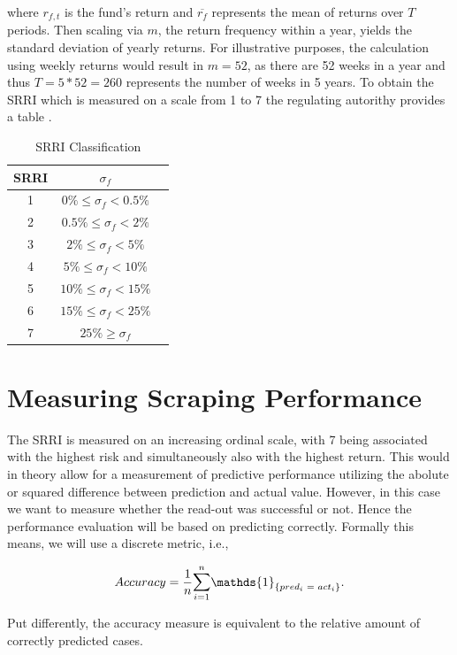 \documentclass[aodsor,preprint]{imsart}
\numberwithin{equation}{section}
\theoremstyle{plain}
\begin{document}
where $r_{f, t}$ is the fund's return and $\overline{r_f}$ represents the mean of returns over $T$ periods. Then scaling via $m$, the return frequency within a year, yields the standard deviation of yearly returns. For illustrative purposes, the calculation using weekly returns would result in $m = 52$, as there are 52 weeks in a year and thus $T = 5 * 52 = 260$ represents the number of weeks in 5 years. To obtain the SRRI which is measured on a scale from 1 to 7 the regulating autorithy provides a table \citep{BGB1}.
\begin{table}[H]
\begin{center}
	\caption{SRRI Classification}
\begin{tabular}{|c|c|c}
	\hline
	SRRI & $\sigma_f$ \\
	\hline
	1 & $0\% \leq\sigma_f<0.5\%$\\
	\hline
	2 & $0.5\%\leq\sigma_f<2\%$\\
	\hline
	3 & $2\%\leq\sigma_f<5\%$\\
	\hline
	4 & $5\%\leq\sigma_f<10\%$\\
	\hline
	5 & $10\%\leq\sigma_f<15\%$\\
	\hline
	6 & $15\%\leq\sigma_f<25\%$\\
	\hline
	7 & $25\%\geq\sigma_f$\\
	\hline
\end{tabular}
\end{center}
\end{table}

\section{Measuring Scraping Performance}

The SRRI is measured on an increasing ordinal scale, with 7 being associated with the highest risk and simultaneously also with the highest return. This would in theory allow for a measurement of predictive performance utilizing the abolute or squared difference between prediction and actual value. However, in this case we want to measure whether the read-out was successful or not. Hence the performance evaluation will be based on predicting correctly. Formally this means, we will use a discrete metric, i.e., 

\[
Accuracy = \frac{1}{n}\mathlarger{\sum}_{i = 1}^n\mathds{1}_{\{pred_i \text{ }= \text{ } act_i\}}\text{.}
\]

Put differently, the accuracy measure is equivalent to the relative amount of correctly predicted cases.
\newpage
\end{document}
